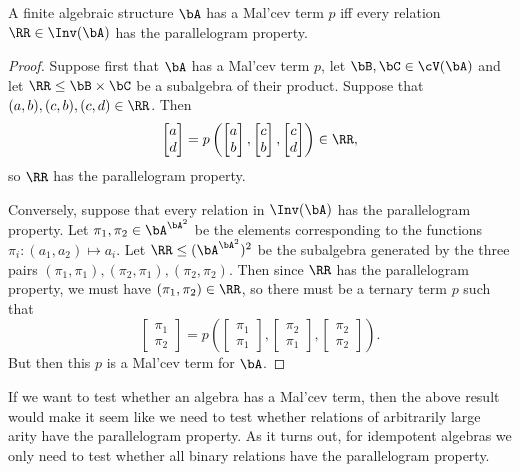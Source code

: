 \begin{thm} A finite algebraic structure $\bA$ has a Mal'cev term $p$ iff every relation $\RR \in \Inv(\bA)$ has the parallelogram property.
\end{thm}
\begin{proof} Suppose first that $\bA$ has a Mal'cev term $p$, let $\bB, \bC \in \cV(\bA)$ and let $\RR \le \bB\times \bC$ be a subalgebra of their product. Suppose that $(a,b), (c,b), (c,d) \in \RR$. Then
\[
\begin{bmatrix} a\\ d\end{bmatrix} = p\left(\begin{bmatrix} a\\ b\end{bmatrix}, \begin{bmatrix} c\\ b\end{bmatrix}, \begin{bmatrix} c\\ d\end{bmatrix}\right) \in \RR,
\]
so $\RR$ has the parallelogram property.

Conversely, suppose that every relation in $\Inv(\bA)$ has the parallelogram property. Let $\pi_1, \pi_2 \in \bA^{\bA^2}$ be the elements corresponding to the functions $\pi_i : (a_1,a_2) \mapsto a_i$. Let $\RR \le (\bA^{\bA^2})^2$ be the subalgebra generated by the three pairs $(\pi_1,\pi_1), (\pi_2,\pi_1), (\pi_2,\pi_2)$. Then since $\RR$ has the parallelogram property, we must have $(\pi_1,\pi_2) \in \RR$, so there must be a ternary term $p$ such that
\[
\begin{bmatrix} \pi_1\\ \pi_2\end{bmatrix} = p\left(\begin{bmatrix} \pi_1\\ \pi_1\end{bmatrix}, \begin{bmatrix} \pi_2\\ \pi_1\end{bmatrix}, \begin{bmatrix} \pi_2\\ \pi_2\end{bmatrix}\right).
\]
But then this $p$ is a Mal'cev term for $\bA$.
\end{proof}

If we want to test whether an algebra has a Mal'cev term, then the above result would make it seem like we need to test whether relations of arbitrarily large arity have the parallelogram property. As it turns out, for idempotent algebras we only need to test whether all binary relations have the parallelogram property.

